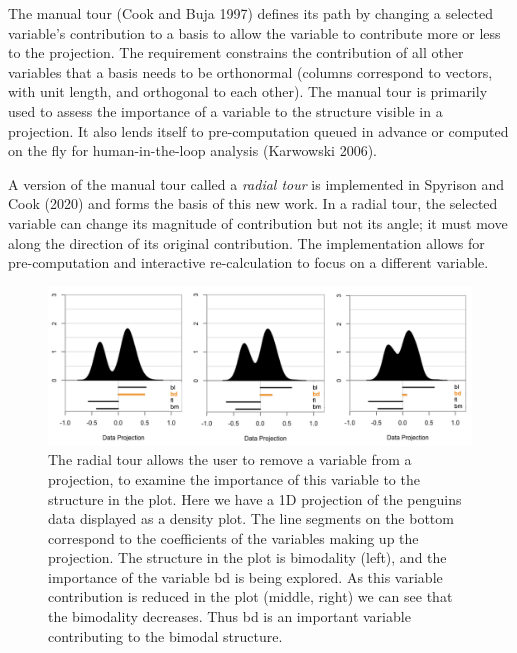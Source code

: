 \documentclass[
]{article}
\begin{document}
The manual tour (Cook and Buja 1997) defines its path by changing a selected variable's contribution to a basis to allow the variable to contribute more or less to the projection. The requirement constrains the contribution of all other variables that a basis needs to be orthonormal (columns correspond to vectors, with unit length, and orthogonal to each other). The manual tour is primarily used to assess the importance of a variable to the structure visible in a projection. It also lends itself to pre-computation queued in advance or computed on the fly for human-in-the-loop analysis (Karwowski 2006).

A version of the manual tour called a \emph{radial tour} is implemented in Spyrison and Cook (2020) and forms the basis of this new work. In a radial tour, the selected variable can change its magnitude of contribution but not its angle; it must move along the direction of its original contribution. The implementation allows for pre-computation and interactive re-calculation to focus on a different variable.

\begin{figure}

{\centering \includegraphics[width=0.99\linewidth]{./figures/radial_tour} 

}

\caption{The radial tour allows the user to remove a variable from a projection, to examine the importance of this variable to the structure in the plot. Here we have a 1D projection of the penguins data displayed as a density plot. The line segments on the bottom correspond to the coefficients of the variables making up the projection. The structure in the plot is bimodality (left), and the importance of the variable \textsf{bd} is being explored. As this variable contribution is reduced in the plot (middle, right) we can see that the bimodality decreases. Thus \textsf{bd} is an important variable contributing to the bimodal structure.}\label{fig:radialtour}
\end{figure}
\end{document}
